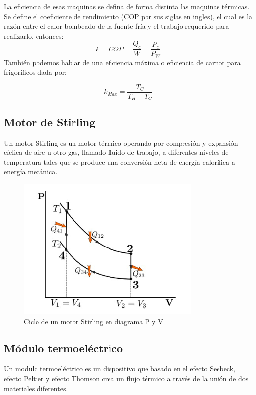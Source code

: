 La eﬁciencia de esas maquinas se deﬁna de forma distinta las maquinas térmicas. Se deﬁne el coeﬁciente de rendimiento (COP por sus siglas en ingles), el cual es la razón entre el calor bombeado de la fuente fría y el trabajo requerido para realizarlo, entonces:
\begin{equation}
    k=COP=\frac{Q_c}{W}=\frac{P_c}{P_W}
\end{equation}
También podemos hablar de una eficiencia máxima o eficiencia de carnot para frigoríficos dada por:

\begin{equation}
    k_{Max}=\frac{T_C}{T_H-T_C}
\end{equation}

\subsection{Motor de Stirling}
Un motor Stirling es un motor térmico operando por compresión y expansión cíclica de aire u otro gas, llamado ﬂuido de trabajo, a diferentes niveles de temperatura tales que se produce una conversión neta de energía caloríﬁca a energía mecánica.
\begin{figure}[H]
    \centering
    \includegraphics[scale=0.6]{img/stirling.png}
    \caption{Ciclo de un motor Stirling en diagrama P y V}
    \label{fig:my_label}
\end{figure}

\subsection{Módulo termoeléctrico}
Un modulo termoeléctrico es un dispositivo que basado en el efecto Seebeck, efecto Peltier y efecto Thomson crea un ﬂujo térmico a través de la unión de dos materiales diferentes.

